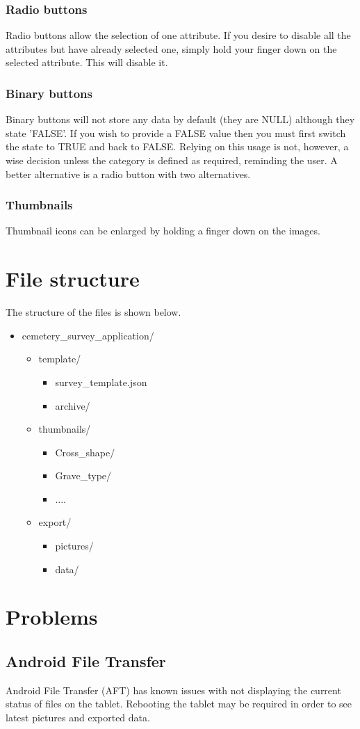 \documentclass{scrreprt}
\begin{document}
\subsection{Radio buttons}
Radio buttons allow the selection of one attribute. If you desire to disable all the attributes but have already selected one, simply hold your finger down on the selected attribute. This will disable it.

\subsection{Binary buttons}
Binary buttons will not store any data by default (they are NULL) although they state 'FALSE'. If you wish to provide a FALSE value then you must first switch the state to TRUE and back to FALSE. Relying on this usage is not, however, a wise decision unless the category is defined as required, reminding the user. A better alternative is a radio button with two alternatives.

\subsection{Thumbnails}
Thumbnail icons can be enlarged by holding a finger down on the images.

\chapter{File structure}
\label{file_structure}
The structure of the files is shown below.

\begin{itemize}
\renewcommand{\labelitemi}{\textbf{}}
\renewcommand{\labelitemii}{\textbf{}}
\renewcommand{\labelitemiii}{\textbf{}}
	\item cemetery_survey_application/
	\begin{itemize}
		\item template/
		\begin{itemize}
			\item survey_template.json
			\item archive/
		\end{itemize}
		\item thumbnails/
		\begin{itemize}
			\item Cross_shape/
			\item Grave_type/
			\item ....
		\end{itemize}
		\item export/
		\begin{itemize}
			\item pictures/
			\item data/
		\end{itemize}
	\end{itemize}
\end{itemize}

\chapter{Problems}
\section{Android File Transfer}
\label{atf}
Android File Transfer (AFT) has known issues with not displaying the current status of files on the tablet. Rebooting the tablet may be required in order to see latest pictures and exported data.
\end{document}
